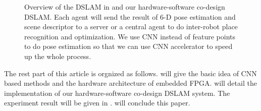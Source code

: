\begin{figure}[thb]
    \begin{minipage}[t]{0.5\linewidth}  
    \centering
    \end{minipage}
    \begin{minipage}[t]{0.5\linewidth}  
    \centering  
    \end{minipage}
    \caption{Overview of the DSLAM in \cite{Cieslewski:20187ee} and our hardware-software co-design DSLAM. Each agent will send the result of 6-D pose estimation and scene descriptor to a server or a central agent to do inter-robot place recognition and optimization. We use CNN instead of feature points to do pose estimation so that we can use CNN accelerator to speed up the whole process.}
    \label{fig:overview}
    \end{figure}

The rest part of this article is orgnized as follows.  will give the basic idea of CNN based methods and the hardware architecture of embedded FPGA.  will detail the implementation of our hardware-software co-design DSLAM system. The experiment result will be given in .  will conclude this paper.